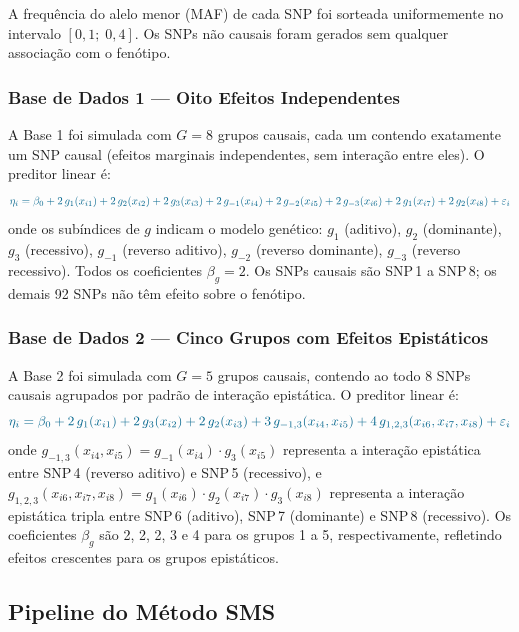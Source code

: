\documentclass[12pt,a4paper]{article}
\newcommand{\novo}[1]{\textcolor{corNova}{#1}}
\begin{document}
\novo{A frequência do alelo menor (MAF) de cada SNP foi sorteada uniformemente no intervalo $[0{,}1;\; 0{,}4]$. Os SNPs não causais foram gerados sem qualquer associação com o fenótipo.}

\subsubsection*{\novo{Base de Dados 1 --- Oito Efeitos Independentes}}

\novo{A Base 1 foi simulada com $G = 8$ grupos causais, cada um contendo exatamente um SNP causal (efeitos marginais independentes, sem interação entre eles). O preditor linear é:}
\[
  \novo{\eta_i = \beta_0 + 2\,g_1(x_{i1}) + 2\,g_2(x_{i2}) + 2\,g_3(x_{i3}) + 2\,g_{-1}(x_{i4})
         + 2\,g_{-2}(x_{i5}) + 2\,g_{-3}(x_{i6}) + 2\,g_1(x_{i7}) + 2\,g_2(x_{i8}) + \varepsilon_i}
\]
\novo{onde os subíndices de $g$ indicam o modelo genético: $g_1$ (aditivo), $g_2$ (dominante), $g_3$ (recessivo), $g_{-1}$ (reverso aditivo), $g_{-2}$ (reverso dominante), $g_{-3}$ (reverso recessivo). Todos os coeficientes $\beta_g = 2$. Os SNPs causais são SNP\,1 a SNP\,8; os demais 92 SNPs não têm efeito sobre o fenótipo.}

\subsubsection*{\novo{Base de Dados 2 --- Cinco Grupos com Efeitos Epistáticos}}

\novo{A Base 2 foi simulada com $G = 5$ grupos causais, contendo ao todo 8 SNPs causais agrupados por padrão de interação epistática. O preditor linear é:}
\[
  \novo{\eta_i = \beta_0
         + 2\,g_1(x_{i1})
         + 2\,g_3(x_{i2})
         + 2\,g_2(x_{i3})
         + 3\,g_{-1,3}(x_{i4}, x_{i5})
         + 4\,g_{1,2,3}(x_{i6}, x_{i7}, x_{i8})
         + \varepsilon_i}
\]
\novo{onde $g_{-1,3}(x_{i4}, x_{i5}) = g_{-1}(x_{i4}) \cdot g_3(x_{i5})$ representa a interação epistática entre SNP\,4 (reverso aditivo) e SNP\,5 (recessivo), e $g_{1,2,3}(x_{i6}, x_{i7}, x_{i8}) = g_1(x_{i6}) \cdot g_2(x_{i7}) \cdot g_3(x_{i8})$ representa a interação epistática tripla entre SNP\,6 (aditivo), SNP\,7 (dominante) e SNP\,8 (recessivo). Os coeficientes $\beta_g$ são 2, 2, 2, 3 e 4 para os grupos 1 a 5, respectivamente, refletindo efeitos crescentes para os grupos epistáticos.}

\subsection*{\novo{Pipeline do Método SMS}}
\end{document}
